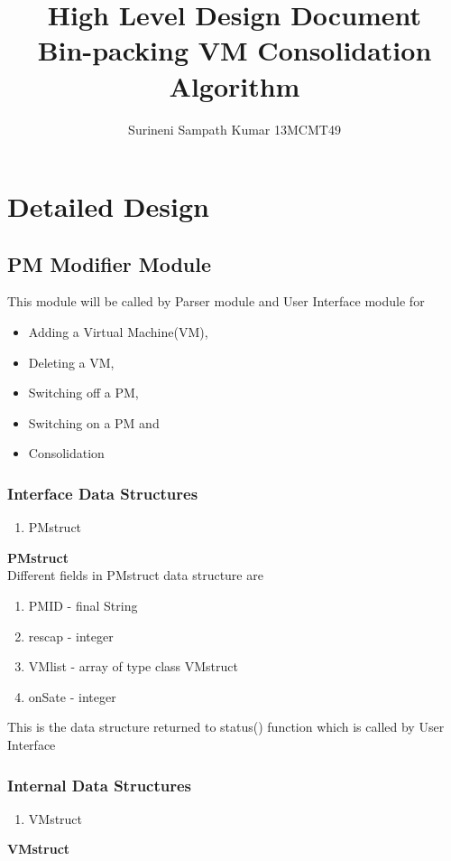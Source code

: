 \documentclass[a4paper,11pt]{article}
\title{High Level Design Document \\ Bin-packing VM Consolidation Algorithm}
\author{Surineni Sampath Kumar 13MCMT49}
\date{}
\begin{document}
\maketitle
\pagebreak
\tableofcontents
\pagebreak

\section{Detailed Design}
\subsection{PM Modifier Module}
This module will be called by Parser module and User Interface module for
\begin{itemize}
 \item Adding a Virtual Machine(VM),
 \item Deleting a VM,
 \item Switching off a PM,
 \item Switching on a PM and
 \item Consolidation
\end{itemize}
\subsubsection{Interface Data Structures}
\begin{enumerate}
 \item PMstruct
 \end{enumerate}
\textbf{PMstruct}
\\

Different fields in PMstruct data structure are
\begin{enumerate}
 \item PM\textunderscore ID - final String
 \item res\textunderscore cap - integer
 \item VM\textunderscore list - array of type class VMstruct
 \item onSate - integer
\end{enumerate}

This is the data structure returned to status() function which is called by User Interface
\\
\subsubsection{Internal Data Structures}
\begin{enumerate}
 \item VMstruct
\end{enumerate}
\textbf{VMstruct}
\\
\end{document}
